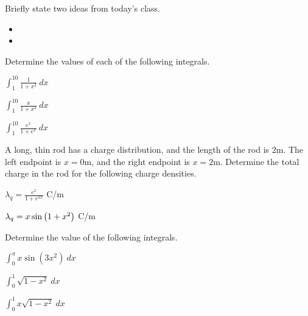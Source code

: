 \postClass

\begin{problem}
\item Briefly state two ideas from today's class.
  \begin{itemize}
  \item
  \item
  \end{itemize}
  \item Determine the values of each of the following integrals.
    \begin{subproblem}
    \item $\int^{10}_1 \frac{1}{1+x^2} ~ dx$
      \vfill
    \item $\int^{10}_1 \frac{x}{1+x^2} ~ dx$
      \vfill
    \item $\int^{10}_1 \frac{e^x}{1+e^{x}} ~ dx$
      \vfill
    \end{subproblem}
  \item A long, thin rod has a charge distribution, and the length of the rod is
      2m. The left endpoint is $x=0$m, and the right endpoint is
      $x=2$m. Determine the total charge in the rod for the following
      charge densities.
      \begin{subproblem}
        \item $\lambda_q = \frac{e^x}{1+e^{2x}}$ C/m
          \vfill
        \item $\lambda_q = x\sin\left( 1+x^2\right)$ C/m
          \vfill
      \end{subproblem}
\end{problem}



\begin{problem}
  \item Determine the value of the following integrals.
    \begin{subproblem}
    \item ${\displaystyle \int^\pi_0 x \sin\left(3x^2\right) ~  dx}$
      \vfill
    \item ${\displaystyle \int^1_0  \sqrt{1-x^2} ~ dx}$
      \vfill
    \item ${\displaystyle \int^1_0 x \sqrt{1-x^2} ~ dx }$
      \vfill
    \end{subproblem}
\end{problem}


